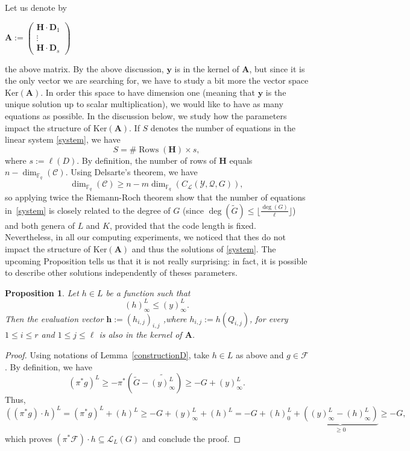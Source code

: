 \documentclass[10pt]{article}
\newtheorem{prop1}[thm]{Proposition}
\theoremstyle{definition}
\theoremstyle{definition}
\theoremstyle{definition}
\newcommand{\cd}{\cdot}
\newcommand{\fq}{\mathbb{F}_q}
\newcommand{\su}{\subseteq}
\newcommand{\Y}{\mathcal{Y}}
\newcommand{\QR}{\mathcal{Q}}
\newcommand{\calL}{\mathcal{L}}
\begin{document}
Let us denote by
\begin{center}
$\mathbf{A} := \begin{pmatrix}
\mathbf{H} \cd \mathbf{D}_1 \\
\vdots \\
\mathbf{H} \cd \mathbf{D}_s
\end{pmatrix}
$
\end{center}
the above matrix. By the above discussion, $\mathbf{y}$ is in the kernel of $\mathbf{A}$, but since it is the only vector we are searching for, we have to study a bit more the vector space $\mathrm{Ker}(\mathbf{A})$. In order this space to have dimension one (meaning that $\mathbf{y}$ is the unique solution up to scalar multiplication), we would like to have as many equations as possible. In the discussion below, we study how the parameters impact the structure of $\mathrm{Ker}(\mathbf{A})$.
If $S$ denotes the number of equations in the linear system \eqref{system}, we have 
\[S = \#\operatorname{Rows}(\mathbf{H}) \times s,\]
where $s := \ell( D)$. By definition, the number of rows of $\mathbf{H}$ equals $n-\dim_{\fq}(\mathcal{C})$. Using Delsarte's theorem, we have
\[\dim_{\fq}(\mathcal{C}) \geq n-m\dim_{\fq}(C_{\mathcal{L}}(\Y,\QR,G)),\]
so applying twice the Riemann-Roch theorem show that the number of equations in~\eqref{system} is closely related to the degree of $G$ (since $\deg(\tilde{G}) \leq \lfloor \frac{\deg(G)}{\ell} \rfloor$) and both genera of $L$ and $K$, provided that the code length is fixed. \\
Nevertheless, in all our computing experiments, we noticed that thes do not impact the structure of $\mathrm{Ker}(\mathbf{A})$ and thus the solutions of \eqref{system}. The upcoming Proposition tells us that it is not really surprising: in fact, it is possible to describe other solutions independently of theses parameters.
\color{black}


\begin{prop1} \label{othersolutions}
Let $h \in L$ be a function such that 
\[ (h)^L_{\infty} \leq (y)^L_{\infty}.\]
 Then the evaluation vector $\mathbf{h}  := (h_{i,j})_{i,j}$ ,where $h_{i,j} := h(Q_{i,j})$, for every $1 \leq i \leq r$ and $1 \leq j \leq \ell$ is also in the kernel of $\mathbf{A}$.
\end{prop1}

\begin{proof}
Using notations of Lemma~\ref{constructionD}, take $h \in L$ as above and $g \in \mathcal{F}$. By definition, we have 
\[(\pi^*g)^L \geq -\pi^*\left(\tilde{G}-\widetilde{(y)^L_{\infty}}\right) \geq - G + (y)^L_{\infty}.\]
Thus, 
\[((\pi^*g) \cd h)^L = (\pi^*g)^L  + (h)^L \geq -G + (y)^L_{\infty}+(h)^L = -G + (h)^L_0 + \underbrace{((y)^L_{\infty}-(h)^L_{\infty})}_{\geq 0} \geq -G,\]
which proves $(\pi^*\mathcal{F})\cd h \su \calL_L(G)$ and conclude the proof.
\end{proof}
\end{document}
